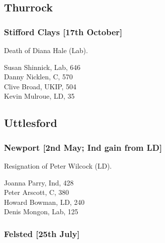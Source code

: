 \documentclass[a4paper,openany,10pt]{book}
\begin{document}
\subsection*{Thurrock}

\subsubsection*{Stifford Clays \hspace*{\fill}\nolinebreak[1]%
\enspace\hspace*{\fill}
[17th October]}


Death of Diana Hale (Lab).



Susan Shinnick, Lab, 646\\
Danny Nicklen, C, 570\\
Clive Broad, UKIP, 504\\
Kevin Mulroue, LD, 35\\


\subsection*{Uttlesford}

\subsubsection*{Newport \hspace*{\fill}\nolinebreak[1]%
\enspace\hspace*{\fill}
[2nd May; Ind gain from LD]}


Resignation of Peter Wilcock (LD).



Joanna Parry, Ind, 428\\
Peter Arscott, C, 380\\
Howard Bowman, LD, 240\\
Denis Mongon, Lab, 125\\


\subsubsection*{Felsted \hspace*{\fill}\nolinebreak[1]%
\enspace\hspace*{\fill}
[25th July]}
\end{document}
